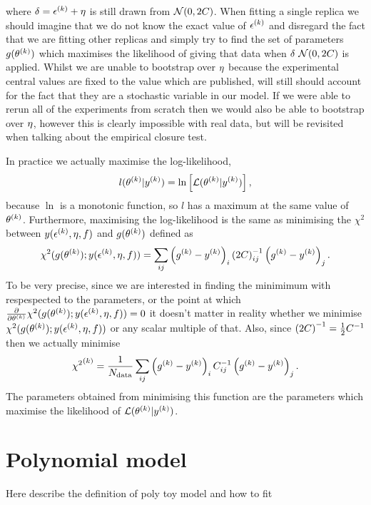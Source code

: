 where $\delta = \epsilon^{(k)} + \eta$ is still drawn from
$\mathcal{N}(0, 2C)$. When fitting a single replica we should imagine that
we do not know the exact value of $\epsilon^{(k)}$ and disregard the fact
that we are fitting other replicas and simply try to find the set of parameters
$g(\theta^{(k)})$ which maximises the likelihood of giving that data
when $\delta ~ \mathcal{N}(0, 2C)$ is applied. Whilst we are unable to
bootstrap over $\eta$ because the experimental central values are fixed
to the value which are published, will still should account for the fact that
they are a stochastic variable in our model. If we were able to rerun all of
the experiments from scratch then we would also be able to bootstrap over
$\eta$, however this is clearly impossible with real data, but will be
revisited when talking about the empirical closure test.

In practice we actually maximise the log-likelihood,
\begin{equation}
    l(\theta^{(k)} \vert y^{(k)}) = \ln \left[
        \mathcal{L}(\theta^{(k)} \vert y^{(k)}) \right],
\end{equation}
because $\ln$ is a monotonic function, so $l$ has a maximum at the same value
of $\theta^{(k)}$. Furthermore, maximising the log-likelihood is the same
as minimising the $\chi^2$ between $y(\epsilon^{(k)}, \eta, f)$
and $g(\theta^{(k)})$ defined as
\begin{equation}
    \chi^2(g(\theta^{(k)}); y(\epsilon^{(k)}, \eta, f))
    = \sum_{ij} \left( g^{(k)} - y^{(k)} \right)_i {(2C)}^{-1}_{ij} \left( g^{(k)} - y^{(k)} \right)_j.
\end{equation}
To be very precise, since
we are interested in finding the minimimum with respespected to the parameters,
or the point at which
$\frac{\partial}{\partial \theta^{(k)}}
\chi^2(g(\theta^{(k)}); y(\epsilon^{(k)}, \eta, f)) = 0$
it doesn't matter in reality whether we minimise
$\chi^2(g(\theta^{(k)}); y(\epsilon^{(k)}, \eta, f))$ or
any scalar multiple of that. Also, since ${(2C)}^{-1} = \frac{1}{2}C^{-1}_{}$
then we actually minimise
\begin{equation}
    {\chi^2}^{(k)} = \frac{1}{N_{\rm data}} \sum_{ij} \left( g^{(k)} - y^{(k)} \right)_i C^{-1}_{ij} \left( g^{(k)} - y^{(k)} \right)_j.
\end{equation}
The parameters obtained from minimising this function are the parameters which
maximise the likelihood of
$\mathcal{L}(\theta^{(k)} \vert y^{(k)})$.
\section{Polynomial model}
Here describe the definition of poly toy model and how to fit
